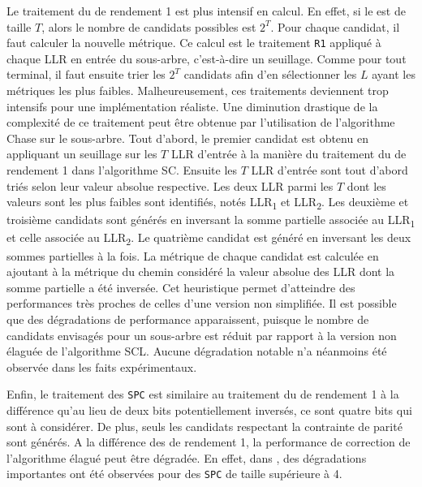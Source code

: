 Le traitement du \noeud de rendement 1 est plus intensif en calcul. En effet, si le \noeud est de taille $T$, alors le nombre de candidats possibles est $2^T$. Pour chaque candidat, il faut calculer la nouvelle métrique. Ce calcul est le traitement \texttt{R1} appliqué à chaque LLR en entrée du sous-arbre, c'est-à-dire un seuillage. Comme pour tout \noeud terminal, il faut ensuite trier les $2^T$ candidats afin d'en sélectionner les $L$ ayant les métriques les plus faibles. Malheureusement, ces traitements deviennent trop intensifs pour une implémentation réaliste. Une diminution drastique de la complexité de ce traitement peut être obtenue par l'utilisation de l'algorithme \og Chase \fg \cite{chase_class_1972} sur le sous-arbre. Tout d'abord, le premier candidat est obtenu en appliquant un seuillage sur les $T$ LLR d'entrée à la manière du traitement du \noeud de rendement 1 dans l'algorithme SC. Ensuite les $T$ LLR d'entrée sont tout d'abord triés selon leur valeur absolue respective. Les deux LLR parmi les $T$  dont les valeurs sont les plus faibles sont identifiés, notés LLR\textsubscript{1} et LLR\textsubscript{2}. Les deuxième et troisième candidats sont générés en inversant la somme partielle associée au LLR\textsubscript{1} et celle associée au LLR\textsubscript{2}. Le quatrième candidat est généré en inversant les deux sommes partielles à la fois. La métrique de chaque candidat est calculée en ajoutant à la métrique du chemin considéré la valeur absolue des LLR dont la somme partielle a été inversée. Cet heuristique permet d'atteindre des performances très proches de celles d'une version non simplifiée. Il est possible que des dégradations de performance apparaissent, puisque le nombre de candidats envisagés pour un sous-arbre est réduit par rapport à la version non élaguée de l'algorithme SCL. Aucune dégradation notable n'a néanmoins été observée dans les faits expérimentaux.

 

Enfin, le traitement des \noeuds \texttt{SPC} est similaire au traitement du \noeud de rendement 1 à la différence qu'au lieu de deux bits potentiellement inversés, ce sont quatre bits qui sont à considérer. De plus, seuls les candidats respectant la contrainte de parité sont générés. A la différence des \noeuds de rendement 1, la performance de correction de l'algorithme élagué peut être dégradée. En effet, dans \cite{sarkis_fast_2016}, des dégradations importantes ont été observées pour des \noeuds \texttt{SPC} de taille supérieure à 4. 



